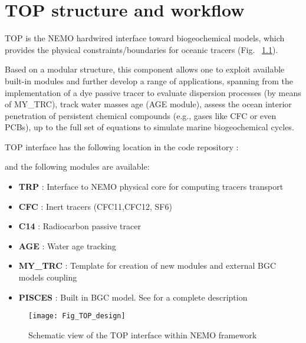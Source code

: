 \documentclass[../main/TOP_manual]{subfiles}
\begin{document}
\chapter{TOP structure and workflow}
\label{chap:ModDes}

TOP is the NEMO hardwired interface toward biogeochemical models, which provides the physical constraints/boundaries for oceanic tracers (Fig. ~\ref{fig:topstructure}).

Based on a modular structure, this component allows one to exploit available built-in modules and further develop a range of applications, spanning from the implementation of a dye passive tracer to evaluate dispersion processes (by means of MY\_TRC), track water masses age (AGE module), assess the ocean interior penetration of persistent chemical compounds (e.g., gases like CFC or even PCBs), up to the full set of equations to simulate marine biogeochemical cycles.

TOP interface has the following location in the code repository : 

and the following modules are available:

\begin{itemize}
        \item \textbf{TRP}    	 :    Interface to NEMO physical core for computing tracers transport
        \item \textbf{CFC}	 :    Inert tracers (CFC11,CFC12, SF6)
        \item \textbf{C14}	 :    Radiocarbon passive tracer
        \item \textbf{AGE}	 :    Water age tracking
        \item \textbf{MY\_TRC}   :    Template for creation of new modules and external BGC models coupling
        \item \textbf{PISCES}    :    Built in BGC model. See \cite{aumont_2015} for a complete description
\end{itemize}

\begin{figure}[ht]
\begin{center}
\vspace{0cm}
\texttt{[image: Fig\_TOP\_design]}
\caption{Schematic view of the TOP interface within NEMO framework}
\label{fig:topstructure}
\end{center}
\end{figure}
\end{document}
